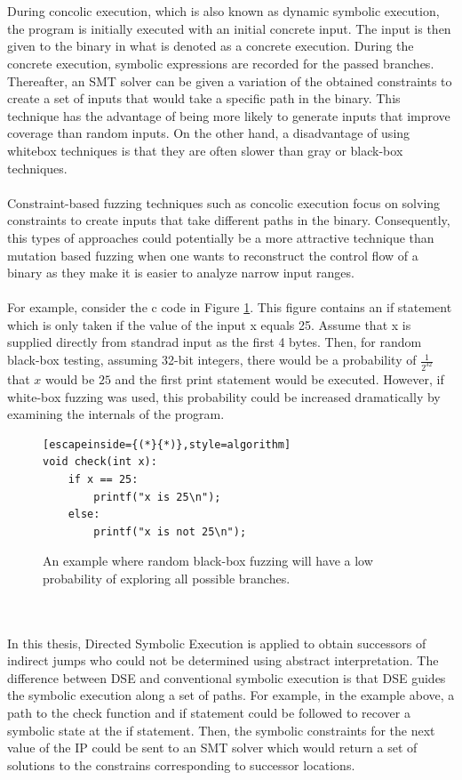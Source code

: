 \documentclass{kththesis}
\begin{document}
\\ \\
During concolic execution, which is also known as dynamic symbolic execution, the program is initially executed with an initial concrete input. The input is then given to the binary in what is denoted as a concrete execution. During the concrete execution, symbolic expressions are recorded for the passed branches. Thereafter, an SMT solver can be given a variation of the obtained constraints to create a set of inputs that would take a specific path in the binary. This technique has the advantage of being more likely to generate inputs that improve coverage than random inputs\cite{fuzzingSurvey}. On the other hand, a disadvantage of using whitebox techniques is that they are often slower than gray or black-box techniques\cite{fuzzingSurvey}.
\\ \\
Constraint-based fuzzing techniques such as concolic execution focus on solving constraints to create inputs that take different paths in the binary. Consequently, this types of approaches could potentially be a more attractive technique than mutation based fuzzing when one wants to reconstruct the control flow of a binary as they make it is easier to analyze narrow input ranges.
\\ \\
For example, consider the c code in Figure \ref{fig:if25}. This figure contains an if statement which is only taken if the value of the input x equals 25. Assume that x is supplied directly from standrad input as the first 4 bytes. Then, for random black-box testing, assuming 32-bit integers, there would be a probability of $\frac{1}{2^{32}}$ that $x$ would be $25$ and the first print statement would be executed. However, if white-box fuzzing was used, this probability could be increased dramatically by examining the internals of the program.
\begin{figure}[ht]
    \centering
\begin{algorithmFrame}
\begin{lstlisting}[escapeinside={(*}{*)},style=algorithm]
void check(int x):
    if x == 25:
        printf("x is 25\n");
    else:
        printf("x is not 25\n");
\end{lstlisting}
\end{algorithmFrame}
\caption{An example where random black-box fuzzing will have a low probability of exploring all possible branches.}
    \label{fig:if25}
\end{figure}
\\ \\
In this thesis, Directed Symbolic Execution is applied to obtain successors of indirect jumps who could not be determined using abstract interpretation. The difference between DSE and conventional symbolic execution is that DSE guides the symbolic execution along a set of paths. For example, in the example above, a path to the check function and if statement could be followed to recover a symbolic state at the if statement. Then, the symbolic constraints for the next value of the IP could be sent to an SMT solver which would return a set of solutions to the constrains corresponding to successor locations.
\end{document}
